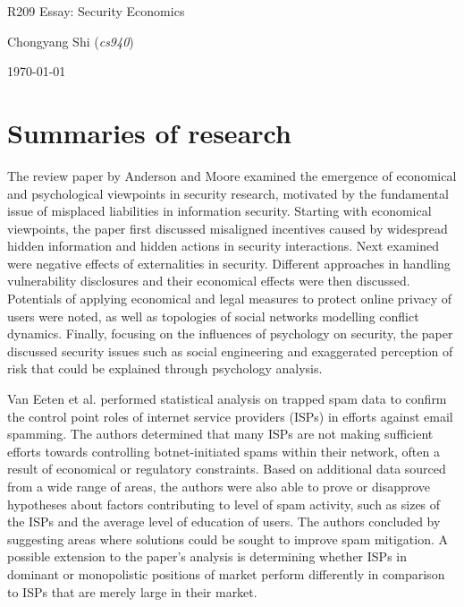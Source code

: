 \documentclass[11pt]{article}
\begin{document}
\centerline{\Large R209 Essay:  Security Economics}
\vspace{2em}
\centerline{\large Chongyang Shi (\emph{cs940})}
\vspace{1em}
\centerline{\large \today}
\vspace{1em}

\section{Summaries of research}

The review paper by Anderson and Moore \cite{anderson2009information} examined the emergence of economical and psychological viewpoints in security research, motivated by the fundamental issue of misplaced liabilities in information security. Starting with economical viewpoints, the paper first discussed misaligned incentives caused by widespread hidden information and hidden actions in security interactions. Next examined were negative effects of externalities in security. Different approaches in handling vulnerability disclosures and their economical effects were then discussed. Potentials of applying economical and legal measures to protect online privacy of users were noted, as well as topologies of social networks modelling conflict dynamics. Finally, focusing on the influences of psychology on security, the paper discussed security issues such as social engineering and exaggerated perception of risk that could be explained through psychology analysis.

Van Eeten et al. \cite{van2010role} performed statistical analysis on trapped spam data to confirm the control point roles of internet service providers (ISPs) in efforts against email spamming. The authors determined that many ISPs are not making sufficient efforts towards controlling botnet-initiated spams within their network, often a result of economical or regulatory constraints. Based on additional data sourced from a wide range of areas, the authors were also able to prove or disapprove hypotheses about factors contributing to level of spam activity, such as sizes of the ISPs and the average level of education of users. The authors concluded by suggesting areas where solutions could be sought to improve spam mitigation. A possible extension to the paper's analysis is determining whether ISPs in dominant or monopolistic positions of market perform differently in comparison to ISPs that are merely large in their market.
\end{document}
